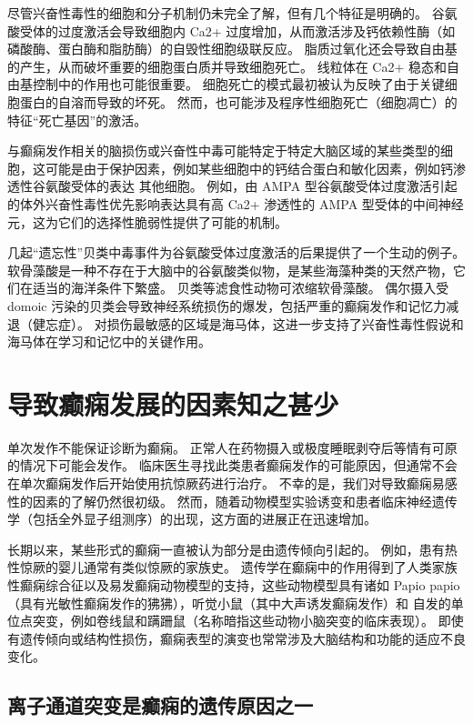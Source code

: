 尽管兴奋性毒性的细胞和分子机制仍未完全了解，但有几个特征是明确的。 谷氨酸受体的过度激活会导致细胞内 Ca2+ 过度增加，从而激活涉及钙依赖性酶（如磷酸酶、蛋白酶和脂肪酶）的自毁性细胞级联反应。 脂质过氧化还会导致自由基的产生，从而破坏重要的细胞蛋白质并导致细胞死亡。 线粒体在 Ca2+ 稳态和自由基控制中的作用也可能很重要。 细胞死亡的模式最初被认为反映了由于关键细胞蛋白的自溶而导致的坏死。 然而，也可能涉及程序性细胞死亡（细胞凋亡）的特征“死亡基因”的激活。

与癫痫发作相关的脑损伤或兴奋性中毒可能特定于特定大脑区域的某些类型的细胞，这可能是由于保护因素，例如某些细胞中的钙结合蛋白和敏化因素，例如钙渗透性谷氨酸受体的表达 其他细胞。 例如，由 AMPA 型谷氨酸受体过度激活引起的体外兴奋性毒性优先影响表达具有高 Ca2+ 渗透性的 AMPA 型受体的中间神经元，这为它们的选择性脆弱性提供了可能的机制。

几起“遗忘性”贝类中毒事件为谷氨酸受体过度激活的后果提供了一个生动的例子。 软骨藻酸是一种不存在于大脑中的谷氨酸类似物，是某些海藻种类的天然产物，它们在适当的海洋条件下繁盛。 贝类等滤食性动物可浓缩软骨藻酸。 偶尔摄入受 domoic 污染的贝类会导致神经系统损伤的爆发，包括严重的癫痫发作和记忆力减退（健忘症）。 对损伤最敏感的区域是海马体，这进一步支持了兴奋性毒性假说和海马体在学习和记忆中的关键作用。


\section{导致癫痫发展的因素知之甚少}
单次发作不能保证诊断为癫痫。 正常人在药物摄入或极度睡眠剥夺后等情有可原的情况下可能会发作。 临床医生寻找此类患者癫痫发作的可能原因，但通常不会在单次癫痫发作后开始使用抗惊厥药进行治疗。 不幸的是，我们对导致癫痫易感性的因素的了解仍然很初级。 然而，随着动物模型实验诱变和患者临床神经遗传学（包括全外显子组测序）的出现，这方面的进展正在迅速增加。

长期以来，某些形式的癫痫一直被认为部分是由遗传倾向引起的。 例如，患有热性惊厥的婴儿通常有类似惊厥的家族史。 遗传学在癫痫中的作用得到了人类家族性癫痫综合征以及易发癫痫动物模型的支持，这些动物模型具有诸如 Papio papio（具有光敏性癫痫发作的狒狒），听觉小鼠（其中大声诱发癫痫发作）和 自发的单位点突变，例如卷线鼠和蹒跚鼠（名称暗指这些动物小脑突变的临床表现）。 即使有遗传倾向或结构性损伤，癫痫表型的演变也常常涉及大脑结构和功能的适应不良变化。

\subsection{离子通道突变是癫痫的遗传原因之一}

